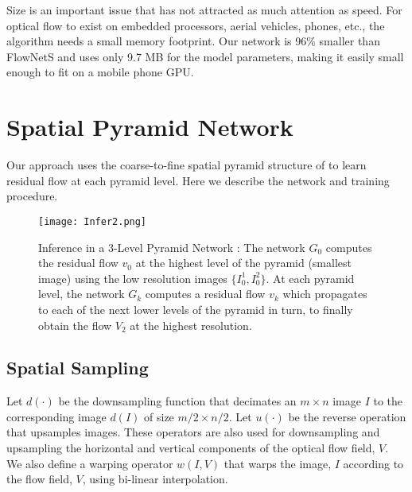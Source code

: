 \documentclass[10pt,twocolumn,letterpaper]{article}
\begin{document}
Size is an important issue that has not attracted as much attention as speed.
For optical flow to exist on embedded processors, aerial vehicles, phones, etc., the algorithm needs a small memory footprint.
Our network is 96\% smaller than FlowNetS and uses only 9.7 MB for the model parameters, making it easily small enough to fit on a mobile phone GPU.


\section{Spatial Pyramid Network}   
Our approach uses the coarse-to-fine spatial pyramid structure of \cite{denton2015deep} to learn residual flow at each pyramid level. 
Here we describe the network and training procedure. %

\begin{figure*}
\centerline{
\texttt{[image: Infer2.png]}
}
\caption{Inference in a 3-Level Pyramid Network \cite{denton2015deep}: The network $G_0$ computes the residual flow $v_0$ at the highest level of the pyramid (smallest image) using the low resolution images $\{I_0^1, I_0^2\}$. At each pyramid level, the network $G_k$ computes a residual flow $v_k$ which propagates to each of the next lower levels of the pyramid in turn, to finally obtain the flow $V_2$ at the highest resolution.}
\label{fig:infer}
\end{figure*}

\subsection{Spatial Sampling}
Let $d(\cdot)$ be the downsampling function that decimates an $m \times n$ image $I$ to the corresponding image $d(I)$ of size $m/2 \times n/2$. Let $u(\cdot)$ be the reverse operation that upsamples images. These operators are also used for downsampling and upsampling the horizontal and vertical components of the optical flow field, $V$. 
We also define a warping operator $w(I,V)$ that warps the image, $I$ according to the flow field, $V$, using  bi-linear interpolation.
\end{document}
